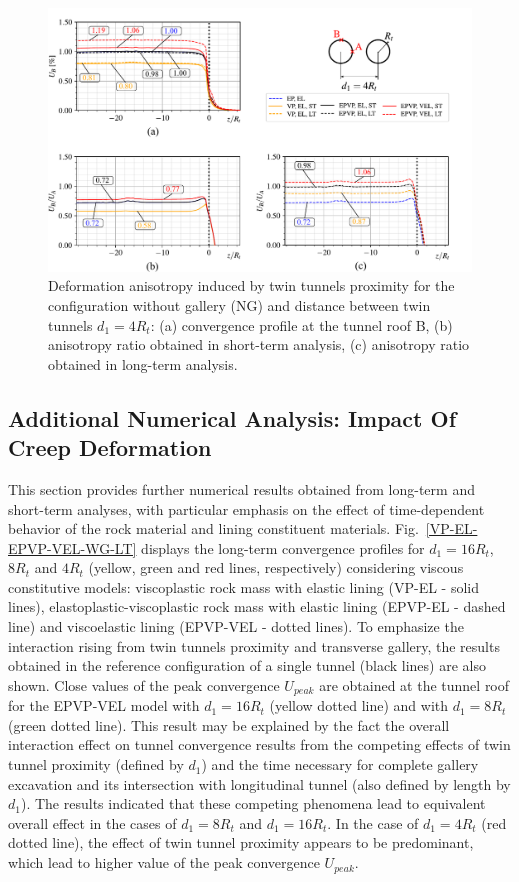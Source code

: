 \documentclass[Journal,letterpaper, NoLists,SectionNumbers]{ascelike-new}
\begin{document}
\begin{figure}[h!]
	\centering
	\includegraphics[scale=0.65]{Convergence Profiles - UB - UAUB - $d_1=4R_t - ST_Lt$.pdf}
	\caption{Deformation anisotropy induced by twin tunnels proximity for the configuration without gallery (NG) and distance between twin tunnels $d_1=4R_t$: (a) convergence profile at the tunnel roof B, (b) anisotropy ratio obtained in short-term analysis, (c) anisotropy ratio obtained in long-term analysis.}
	\label{UB-UAUB-D1_4RT}
\end{figure}


\subsection{Additional Numerical Analysis: Impact Of Creep Deformation}\label{sec73}

This section provides further numerical results obtained from long-term and short-term analyses, with particular emphasis on the effect of time-dependent behavior of the rock material and lining constituent materials. Fig.~\ref{VP-EL-EPVP-VEL-WG-LT} displays the long-term convergence profiles for $d_1=16R_t$, $8R_t$ and $4R_t$ (yellow, green and red lines, respectively) considering viscous constitutive models: viscoplastic rock mass with elastic lining (VP-EL - solid lines), elastoplastic-viscoplastic rock mass with elastic lining (EPVP-EL - dashed line) and viscoelastic lining (EPVP-VEL - dotted lines). To emphasize the interaction rising from twin tunnels proximity and transverse gallery, the results obtained in the reference configuration of a single tunnel (black lines) are also shown. Close values of the peak convergence  $U_{peak}$ are obtained at the tunnel roof for the EPVP-VEL model with $d_1=16R_t$ (yellow dotted line) and with $d_1=8R_t$ (green dotted line). This result may be explained by the fact the overall interaction effect on tunnel convergence results from the competing effects of twin tunnel proximity (defined by $d_1$) and the time necessary for complete gallery excavation and its intersection with longitudinal tunnel (also defined by length by $d_1$). The results indicated that these competing phenomena lead to equivalent overall effect in the cases of $d_1=8R_t$ and $d_1=16R_t$. In the case of $d_1=4R_t$ (red dotted line), the effect of twin tunnel proximity appears to be predominant, which lead to higher value of the peak convergence  $U_{peak}$.
\end{document}
